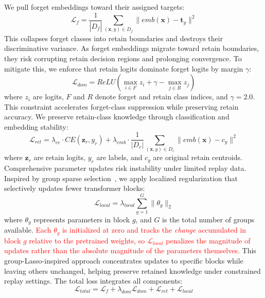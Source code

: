 We pull forget embeddings toward their assigned targets:
\begin{equation}
\mathcal{L}_{\textit{f}} = \frac{1}{|D_\textit{f}|}\sum_{(\mathbf{x}, y) \in D_\textit{f}} \|\textit{emb}(\mathbf{x}) - \mathbf{t}_y\|^2
\end{equation}
This collapses forget classes into retain boundaries and destroys their discriminative variance. As forget embeddings migrate toward retain boundaries, they risk corrupting retain decision regions and prolonging convergence. To mitigate this, we enforce that retain logits dominate forget logits by margin $\gamma$:
\begin{equation}
\mathcal{L}_{\textit{dom}} = \textit{ReLU}\left(\max_{i \in F} z_i + \gamma - \max_{j \in R} z_j\right)
\end{equation}
where $z_i$ are logits, $F$ and $R$ denote forget and retain class indices, and $\gamma = 2.0$. This constraint accelerates forget-class suppression while preserving retain accuracy. We preserve retain-class knowledge through classification and embedding stability:
\begin{equation}
\mathcal{L}_{\textit{ret}} = \lambda_{\textit{ce}} \cdot \textit{CE}(\mathbf{z}_r, y_r) + \lambda_{\textit{emb}} \cdot \frac{1}{|D_\textit{r}|}\sum_{(\mathbf{x}, y) \in D_\textit{r}} \|\textit{emb}(\mathbf{x}) - c_y\|^2
\end{equation}
where $\mathbf{z}_r$ are retain logits, $y_r$ are labels, and $c_y$ are original retain centroids.
Comprehensive parameter updates risk instability under limited replay data. Inspired by group sparse selection~\cite{zhao2024continual}, we apply localized regularization that selectively updates fewer transformer blocks:
\begin{equation}
\mathcal{L}_{\textit{local}} = \lambda_{\textit{local}} \sum_{g=1}^{G} \|\theta_g\|_2
\end{equation}
where $\theta_g$ represents parameters in block $g$, and $G$ is the total number of groups available. \textcolor{red}{Each $\theta_g$ is initialized at zero and tracks the \emph{change} accumulated in block $g$ relative to the pretrained weights, so $\mathcal{L}_{\textit{local}}$ penalizes the magnitude of updates rather than the absolute magnitude of the parameters themselves.} This group-Lasso-inspired approach concentrates updates to specific blocks while leaving others unchanged, helping preserve retained knowledge under constrained replay settings. The total loss integrates all components:
\begin{equation}
\mathcal{L}_{\textit{total}} = \mathcal{L}_{\textit{f}} + \lambda_{\textit{dom}} \mathcal{L}_{\textit{dom}} + \mathcal{L}_{\textit{ret}} + \mathcal{L}_{\textit{local}}
\end{equation}

